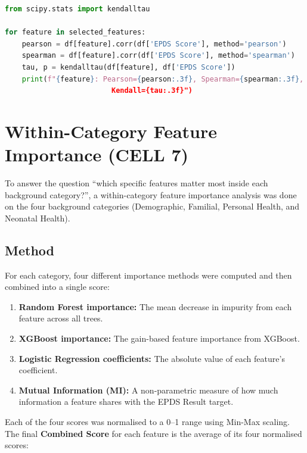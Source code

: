 \begin{lstlisting}[language=Python, caption={Three-way correlation analysis of selected features vs. EPDS Score.}]
from scipy.stats import kendalltau

for feature in selected_features:
    pearson = df[feature].corr(df['EPDS Score'], method='pearson')
    spearman = df[feature].corr(df['EPDS Score'], method='spearman')
    tau, p = kendalltau(df[feature], df['EPDS Score'])
    print(f"{feature}: Pearson={pearson:.3f}, Spearman={spearman:.3f},
                         Kendall={tau:.3f}")
\end{lstlisting}

\section{Within-Category Feature Importance (CELL 7)}
\label{ch3-sec-within-category}

To answer the question ``which specific features matter most inside each background category?'', a within-category feature importance analysis was done on the four background categories (Demographic, Familial, Personal Health, and Neonatal Health).

\subsection{Method}

For each category, four different importance methods were computed and then combined into a single score:

\begin{enumerate}
    \item \textbf{Random Forest importance:} The mean decrease in impurity from each feature across all trees.
    \item \textbf{XGBoost importance:} The gain-based feature importance from XGBoost.
    \item \textbf{Logistic Regression coefficients:} The absolute value of each feature's coefficient.
    \item \textbf{Mutual Information (MI):} A non-parametric measure of how much information a feature shares with the EPDS Result target.
\end{enumerate}

Each of the four scores was normalised to a 0--1 range using Min-Max scaling. The final \textbf{Combined Score} for each feature is the average of its four normalised scores:

